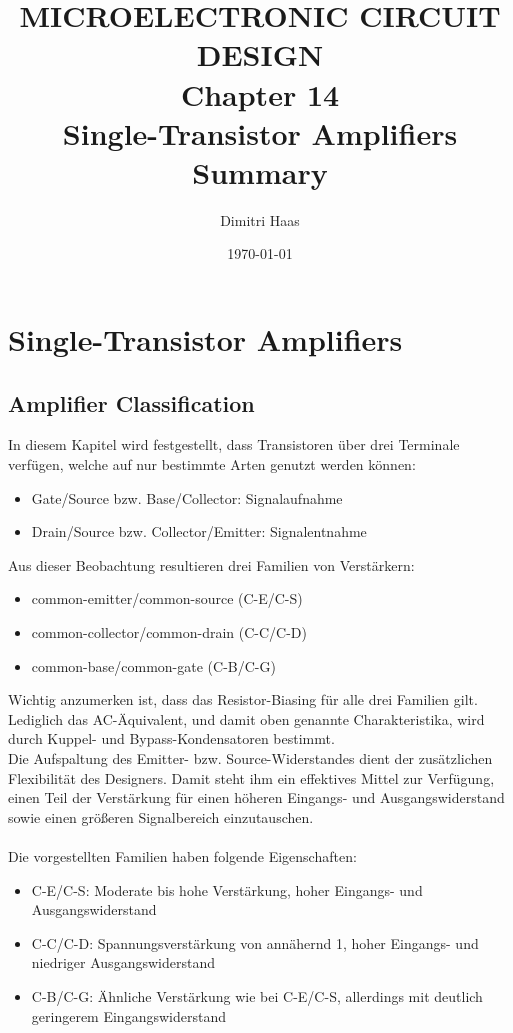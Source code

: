 \documentclass[11pt,a4paper,titlepage]{article}
\title{\blue MICROELECTRONIC CIRCUIT DESIGN \\	\blueb Chapter 14 \\ Single-Transistor Amplifiers \\ Summary}
\author{Dimitri Haas}
\date{\today}
\begin{document}
\maketitle
\setcounter{section}{13}
\section{Single-Transistor Amplifiers}
\subsection{Amplifier Classification}
In diesem Kapitel wird festgestellt, dass Transistoren über drei Terminale verfügen, welche auf nur bestimmte Arten genutzt werden können:
\begin{itemize}
	\item Gate/Source bzw. Base/Collector: Signalaufnahme
	\item Drain/Source bzw. Collector/Emitter: Signalentnahme
\end{itemize}
Aus dieser Beobachtung resultieren drei Familien von Verstärkern:
\begin{itemize}
	\item common-emitter/common-source (C-E/C-S)
	\item common-collector/common-drain (C-C/C-D)
	\item common-base/common-gate (C-B/C-G)
\end{itemize}
Wichtig anzumerken ist, dass das Resistor-Biasing für alle drei Familien gilt. Lediglich das AC-Äquivalent, und damit oben genannte Charakteristika, wird durch Kuppel- und Bypass-Kondensatoren bestimmt.\\
Die Aufspaltung des Emitter- bzw. Source-Widerstandes dient der zusätzlichen Flexibilität des Designers. Damit steht ihm ein effektives Mittel zur Verfügung, einen Teil der Verstärkung für einen höheren Eingangs- und  Ausgangswiderstand sowie einen größeren Signalbereich einzutauschen.\\
\\
Die vorgestellten Familien haben folgende Eigenschaften:
\begin{itemize}
	\item C-E/C-S: Moderate bis hohe Verstärkung, hoher Eingangs- und Ausgangswiderstand
	\item C-C/C-D: Spannungsverstärkung von annähernd 1, hoher Eingangs- und niedriger Ausgangswiderstand
	\item C-B/C-G: Ähnliche Verstärkung wie bei C-E/C-S, allerdings mit deutlich geringerem Eingangswiderstand
\end{itemize} 
\end{document}
